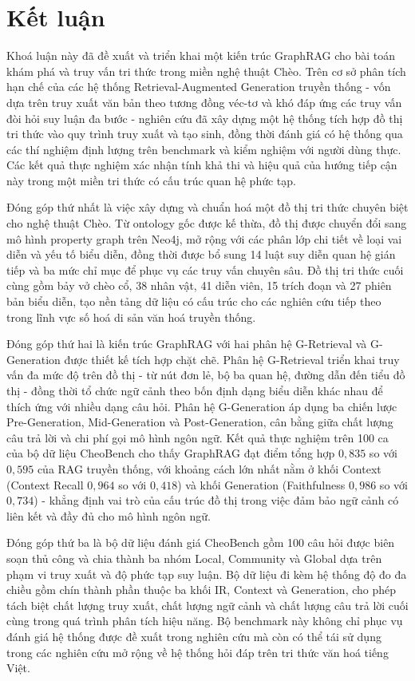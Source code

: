 \section{Kết luận}

Khoá luận này đã đề xuất và triển khai một kiến trúc GraphRAG cho bài toán khám phá và truy vấn tri thức trong miền nghệ thuật Chèo. Trên cơ sở phân tích hạn chế của các hệ thống Retrieval-Augmented Generation truyền thống - vốn dựa trên truy xuất văn bản theo tương đồng véc-tơ và khó đáp ứng các truy vấn đòi hỏi suy luận đa bước - nghiên cứu đã xây dựng một hệ thống tích hợp đồ thị tri thức vào quy trình truy xuất và tạo sinh, đồng thời đánh giá có hệ thống qua các thí nghiệm định lượng trên benchmark và kiểm nghiệm với người dùng thực. Các kết quả thực nghiệm xác nhận tính khả thi và hiệu quả của hướng tiếp cận này trong một miền tri thức có cấu trúc quan hệ phức tạp.

Đóng góp thứ nhất là việc xây dựng và chuẩn hoá một đồ thị tri thức chuyên biệt cho nghệ thuật Chèo. Từ ontology gốc được kế thừa, đồ thị được chuyển đổi sang mô hình property graph trên Neo4j, mở rộng với các phân lớp chi tiết về loại vai diễn và yếu tố biểu diễn, đồng thời được bổ sung 14 luật suy diễn quan hệ gián tiếp và ba mức chỉ mục để phục vụ các truy vấn chuyên sâu. Đồ thị tri thức cuối cùng gồm bảy vở chèo cổ, 38 nhân vật, 41 diễn viên, 15 trích đoạn và 27 phiên bản biểu diễn, tạo nền tảng dữ liệu có cấu trúc cho các nghiên cứu tiếp theo trong lĩnh vực số hoá di sản văn hoá truyền thống.

Đóng góp thứ hai là kiến trúc GraphRAG với hai phân hệ G-Retrieval và G-Generation được thiết kế tích hợp chặt chẽ. Phân hệ G-Retrieval triển khai truy vấn đa mức độ trên đồ thị - từ nút đơn lẻ, bộ ba quan hệ, đường dẫn đến tiểu đồ thị - đồng thời tổ chức ngữ cảnh theo bốn định dạng biểu diễn khác nhau để thích ứng với nhiều dạng câu hỏi. Phân hệ G-Generation áp dụng ba chiến lược Pre-Generation, Mid-Generation và Post-Generation, cân bằng giữa chất lượng câu trả lời và chi phí gọi mô hình ngôn ngữ. Kết quả thực nghiệm trên 100 ca của bộ dữ liệu CheoBench cho thấy GraphRAG đạt điểm tổng hợp $0,835$ so với $0,595$ của RAG truyền thống, với khoảng cách lớn nhất nằm ở khối Context (Context Recall $0,964$ so với $0,418$) và khối Generation (Faithfulness $0,986$ so với $0,734$) - khẳng định vai trò của cấu trúc đồ thị trong việc đảm bảo ngữ cảnh có liên kết và đầy đủ cho mô hình ngôn ngữ.

Đóng góp thứ ba là bộ dữ liệu đánh giá CheoBench gồm 100 câu hỏi được biên soạn thủ công và chia thành ba nhóm Local, Community và Global dựa trên phạm vi truy xuất và độ phức tạp suy luận. Bộ dữ liệu đi kèm hệ thống độ đo đa chiều gồm chín thành phần thuộc ba khối IR, Context và Generation, cho phép tách biệt chất lượng truy xuất, chất lượng ngữ cảnh và chất lượng câu trả lời cuối cùng trong quá trình phân tích hiệu năng. Bộ benchmark này không chỉ phục vụ đánh giá hệ thống được đề xuất trong nghiên cứu mà còn có thể tái sử dụng trong các nghiên cứu mở rộng về hệ thống hỏi đáp trên tri thức văn hoá tiếng Việt.

